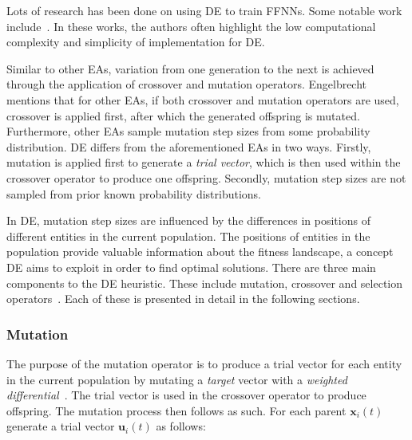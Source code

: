 Lots of research has been done on using \acs{DE} to train \acp{FFNN}. Some notable work include~\cite{ref:ilonen:2003, ref:slowik:2008, ref:mingguang:2009}. In these works, the authors often highlight the low computational complexity and simplicity of implementation for \acs{DE}.

Similar to other \acp{EA}, variation from one generation to the next is achieved through the application of crossover and mutation operators. Engelbrecht~\cite{ref:engelbrecht:2007} mentions that for other \acp{EA}, if both crossover and mutation operators are used, crossover is applied first, after which the generated offspring is mutated. Furthermore, other \acp{EA} sample mutation step sizes from some probability distribution. \acs{DE} differs from the aforementioned \acp{EA} in two ways. Firstly, mutation is applied first to generate a \textit{trial vector}, which is then used within the crossover operator to produce one offspring. Secondly, mutation step sizes are not sampled from prior known probability distributions.

In \acs{DE}, mutation step sizes are influenced by the differences in positions of different entities in the current population. The positions of entities in the population provide valuable information about the fitness landscape, a concept \acs{DE} aims to exploit in order to find optimal solutions. There are three main components to the \acs{DE} heuristic. These include mutation, crossover and selection operators~\cite{ref:price:2006}. Each of these is presented in detail in the following sections.

\subsubsection{Mutation}\label{sec:heuristics:mh:de:mutation}

The purpose of the mutation operator is to produce a trial vector for each entity in the current population by mutating a \textit{target} vector with a \textit{weighted differential}~\cite{ref:engelbrecht:2007}. The trial vector is used in the crossover operator to produce offspring. The mutation process then follows as such. For each parent $\boldsymbol{x}_{i}(t)$ generate a trial vector $\boldsymbol{u}_{i}(t)$ as follows:

